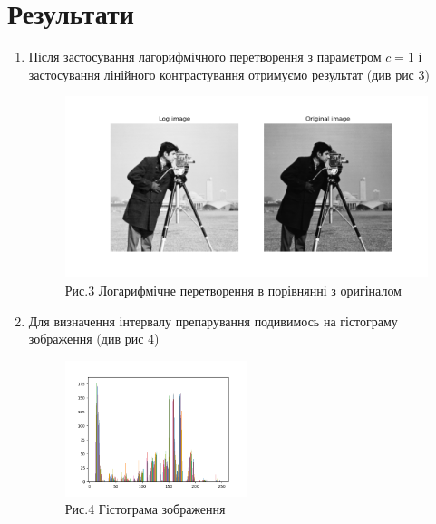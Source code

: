 \pagebreak

\section*{Результати}

\begin{enumerate}
    \item Після застосування лагорифмічного перетворення з параметром $c = 1$ і застосування 
    лінійного контрастування отримуємо результат (див рис 3)
    \begin{figure}[h]
        \includegraphics[width=\textwidth]{img_1.png}
        \caption*{Рис.3 Логарифмічне перетворення в порівнянні з оригіналом}
    \end{figure}

    \item Для визначення інтервалу препарування подивимось на гістограму зображення 
    (див рис 4)
    \begin{figure}[h]
        \begin{center}
            \includegraphics[width=0.5\textwidth]{hist.png}
        \end{center}
        \caption*{Рис.4 Гістограма зображення}
    \end{figure}
    

\end{enumerate}
